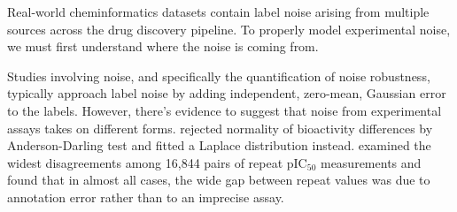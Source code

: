 
Real-world cheminformatics datasets contain label noise arising from multiple sources across the drug discovery pipeline. To properly model experimental noise, we must first understand where the noise is coming from.

Studies involving noise, and specifically the quantification of noise robustness, typically approach label noise by adding independent, zero-mean, Gaussian error to the labels. However, there's evidence to suggest that noise from experimental assays takes on different forms. \cite{Kruger2012} rejected normality of bioactivity differences by Anderson-Darling test and fitted a Laplace distribution instead. \citet{Kalliokoski2013} examined the widest disagreements among 16,844 pairs of repeat pIC$_{50}$ measurements and found that in almost all cases, the wide gap between repeat values was due to annotation error rather than to an imprecise assay.

